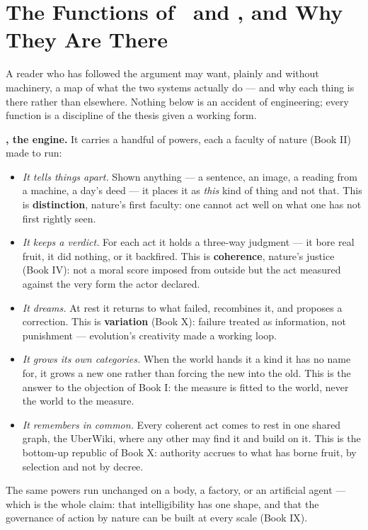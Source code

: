 \section{The Functions of \physis\ and \praxis, and Why They Are There}

A reader who has followed the argument may want, plainly and without machinery, a
map of what the two systems actually do --- and why each thing is there rather than
elsewhere. Nothing below is an accident of engineering; every function is a
discipline of the thesis given a working form.

\textbf{\physis, the engine.} It carries a handful of powers, each a faculty of
nature (Book II) made to run:

\begin{itemize}
\item \emph{It tells things apart.} Shown anything --- a sentence, an image, a
  reading from a machine, a day's deed --- it places it as \emph{this} kind of thing
  and not that. This is \textbf{distinction}, nature's first faculty: one cannot act
  well on what one has not first rightly seen.
\item \emph{It keeps a verdict.} For each act it holds a three-way judgment --- it
  bore real fruit, it did nothing, or it backfired. This is \textbf{coherence},
  nature's justice (Book IV): not a moral score imposed from outside but the act
  measured against the very form the actor declared.
\item \emph{It dreams.} At rest it returns to what failed, recombines it, and
  proposes a correction. This is \textbf{variation} (Book X): failure treated as
  information, not punishment --- evolution's creativity made a working loop.
\item \emph{It grows its own categories.} When the world hands it a kind it has no
  name for, it grows a new one rather than forcing the new into the old. This is the
  answer to the objection of Book I: the measure is fitted to the world, never the
  world to the measure.
\item \emph{It remembers in common.} Every coherent act comes to rest in one shared
  graph, the UberWiki, where any other may find it and build on it. This is the
  bottom-up republic of Book X: authority accrues to what has borne fruit, by
  selection and not by decree.
\end{itemize}

\noindent The same powers run unchanged on a body, a factory, or an artificial
agent --- which is the whole claim: that intelligibility has one shape, and that the
governance of action by nature can be built at every scale (Book IX).

